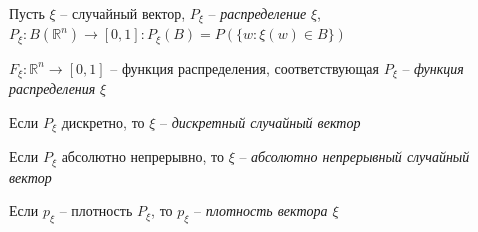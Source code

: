 \begin{definition}
Пусть $\xi$ -- случайный вектор, $P_{\xi}$ -- \textit{ распределение} $\xi$,  $P_{\xi} : B(\mathbb{R}^n) \to [0, 1] : P_{\xi}(B) = P(\{w : \xi(w) \in B\})$

$F_{\xi}: \mathbb{R}^n \to [0, 1]$ -- функция распределения, соответствующая $P_{\xi}$ -- \textit{функция распределения} $\xi$


Если $P_{\xi}$ дискретно, то $\xi$ -- \textit{дискретный случайный вектор}

Если $P_{\xi}$ абсолютно непрерывно, то $\xi$ -- \textit{абсолютно непрерывный случайный вектор}

Если $p_{\xi}$ -- плотность $P_{\xi}$, то $p_{\xi}$ -- \textit{плотность вектора $\xi$}
\end{definition}